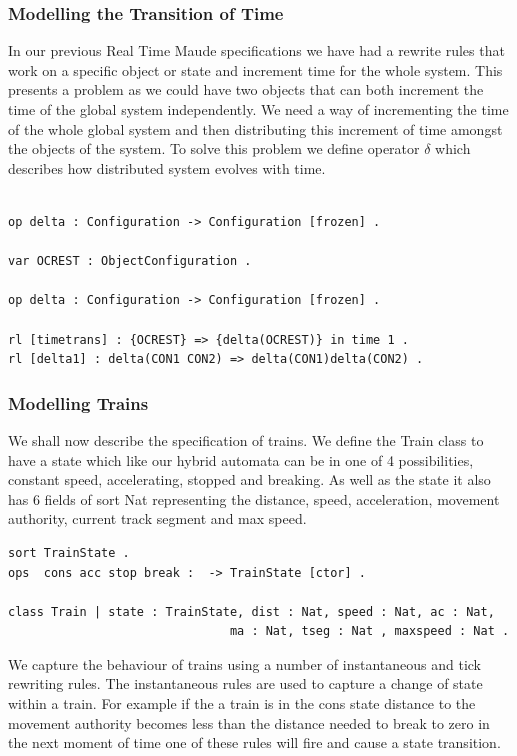 \subsubsection*{Modelling the Transition of Time}
In our previous Real Time Maude specifications we have had a rewrite rules that work on a specific object or state and increment time for the whole system. This presents a problem as we could have two objects that can both increment the time of the global system independently. We need a way of incrementing the time of the whole global system and then distributing this increment of time amongst the objects of the system. To solve this problem we define operator $\delta$ which describes how distributed system evolves with time.
\begin{verbatim}

op delta : Configuration -> Configuration [frozen] . 

var OCREST : ObjectConfiguration .

op delta : Configuration -> Configuration [frozen] . 

rl [timetrans] : {OCREST} => {delta(OCREST)} in time 1 .
rl [delta1] : delta(CON1 CON2) => delta(CON1)delta(CON2) .

\end{verbatim}

\subsubsection*{Modelling Trains}
We shall now describe the specification of trains. We define the Train class to have a state which like our hybrid automata can be in one of 4 possibilities, constant speed, accelerating, stopped and breaking. As well as the state it also has 6 fields of sort Nat representing the distance, speed, acceleration, movement authority,  current track segment and max speed.

\begin{verbatim}
sort TrainState .
ops  cons acc stop break :  -> TrainState [ctor] .

class Train | state : TrainState, dist : Nat, speed : Nat, ac : Nat,  
                               ma : Nat, tseg : Nat , maxspeed : Nat .
\end{verbatim}

We capture the behaviour of trains using a number of instantaneous and tick rewriting rules. The instantaneous rules are used to capture a change of state within a train. For example if the a train is in the cons state distance to the movement authority becomes less than the distance needed to break to zero in the next moment of time one of these rules will fire and cause a state transition. 

